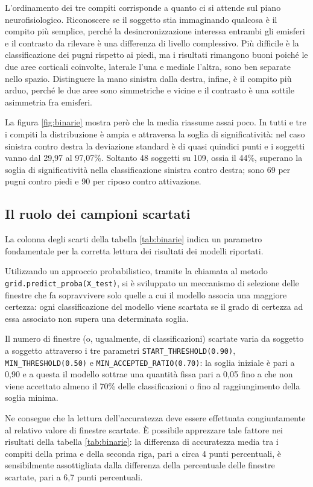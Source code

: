 L’ordinamento dei tre compiti corrisponde a quanto ci si attende sul piano neurofisiologico. Riconoscere se il soggetto stia immaginando qualcosa è il compito più semplice, perché la desincronizzazione interessa entrambi gli emisferi e il contrasto da rilevare è una differenza di livello complessivo. Più difficile è la classificazione dei pugni rispetto ai piedi, ma i risultati rimangono buoni poiché le due aree corticali coinvolte, laterale l’una e mediale l’altra, sono ben separate nello spazio. Distinguere la mano sinistra dalla destra, infine, è il compito più arduo, perché le due aree sono simmetriche e vicine e il contrasto è una sottile asimmetria fra emisferi.

La figura \ref{fig:binarie} mostra però che la media riassume assai poco. In tutti e tre i compiti la distribuzione è ampia e attraversa la soglia di significatività: nel caso sinistra contro destra la deviazione standard è di quasi quindici punti e i soggetti vanno dal 29,97 al 97,07\%. Soltanto 48 soggetti su 109, ossia il 44\%, superano la soglia di significatività nella classificazione sinistra contro destra; sono 69 per pugni contro piedi e 90 per riposo contro attivazione.

\subsection{Il ruolo dei campioni scartati}
La colonna degli scarti della tabella \ref{tab:binarie} indica un parametro fondamentale per la corretta lettura dei risultati dei modelli riportati.

Utilizzando un approccio probabilistico, tramite la chiamata al metodo \texttt{grid.\allowbreak predict\_proba(X\_test)}, si è sviluppato un meccanismo di selezione delle finestre che fa sopravvivere solo quelle a cui il modello associa una maggiore certezza: ogni classificazione del modello viene scartata se il grado di certezza ad essa associato non supera una determinata soglia. 

Il numero di finestre (o, ugualmente, di classificazioni) scartate varia da soggetto a soggetto attraverso i tre parametri \texttt{START\_THRESHOLD(0.90)}, \texttt{MIN\_THRESHOLD(0.50)} e \texttt{MIN\_ACCEPTED\_RATIO(0.70)}: la soglia iniziale è pari a 0,90 e a questa il modello sottrae una quantità fissa pari a 0,05 fino a che non viene accettato almeno il 70\% delle classificazioni o fino al raggiungimento della soglia minima. 

Ne consegue che la lettura dell'accuratezza deve essere effettuata congiuntamente al relativo valore di finestre scartate. È possibile apprezzare tale fattore nei risultati della tabella \ref{tab:binarie}: la differenza di accuratezza media tra i compiti della prima e della seconda riga, pari a circa 4 punti percentuali, è sensibilmente assottigliata dalla differenza della percentuale delle finestre scartate, pari a 6,7 punti percentuali.

